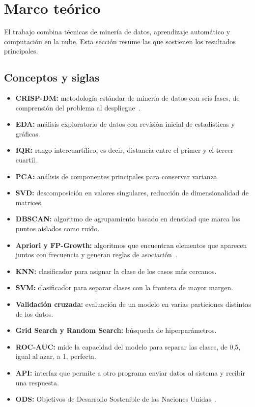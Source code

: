 \documentclass[conference,a4paper]{IEEEtran}
\begin{document}
\section{Marco teórico}

El trabajo combina técnicas de minería de datos, aprendizaje automático y computación en la nube. Esta sección resume las que sostienen los resultados principales.

\subsection{Conceptos y siglas}

\begin{itemize}
\item \textbf{CRISP-DM:} metodología estándar de minería de datos con seis fases, de comprensión del problema al despliegue~\cite{wirth2000}.
\item \textbf{EDA:} análisis exploratorio de datos con revisión inicial de estadísticas y gráficas.
\item \textbf{IQR:} rango intercuartílico, es decir, distancia entre el primer y el tercer cuartil.
\item \textbf{PCA:} análisis de componentes principales para conservar varianza.
\item \textbf{SVD:} descomposición en valores singulares, reducción de dimensionalidad de matrices.
\item \textbf{DBSCAN:} algoritmo de agrupamiento basado en densidad que marca los puntos aislados como ruido.
\item \textbf{Apriori y FP-Growth:} algoritmos que encuentran elementos que aparecen juntos con frecuencia y generan reglas de asociación~\cite{agrawal1994,han2000}.
\item \textbf{KNN:} clasificador para asignar la clase de los casos más cercanos.
\item \textbf{SVM:} clasificador para separar clases con la frontera de mayor margen.
\item \textbf{Validación cruzada:} evaluación de un modelo en varias particiones distintas de los datos.
\item \textbf{Grid Search y Random Search:} búsqueda de hiperparámetros.
\item \textbf{ROC-AUC:} mide la capacidad del modelo para separar las clases, de 0,5, igual al azar, a 1, perfecta.
\item \textbf{API:} interfaz que permite a otro programa enviar datos al sistema y recibir una respuesta.
\item \textbf{ODS:} Objetivos de Desarrollo Sostenible de las Naciones Unidas~\cite{un2015}.
\end{itemize}
\end{document}
